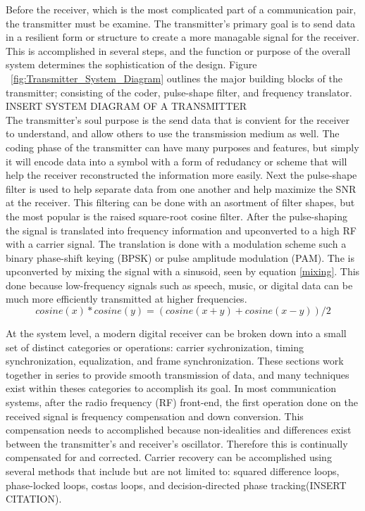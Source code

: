 \documentclass[11pt]{mvlthesis}
\begin{document}
Before the receiver, which is the most complicated part of a communication pair, the transmitter must be examine.  The transmitter's primary goal is to send data in a resilient form or structure to create a more managable signal for the receiver.  This is accomplished in several steps, and the function or purpose of the overall system determines the sophistication of the design.  Figure ~\ref{fig:Transmitter_System_Diagram} outlines the major building blocks of the transmitter; consisting of the coder, pulse-shape filter, and frequency translator.\\

INSERT SYSTEM DIAGRAM OF A TRANSMITTER\\

The transmitter's soul purpose is the send data that is convient for the receiver to understand, and allow others to use the transmission medium as well.  The coding phase of the transmitter can have many purposes and features, but simply it will encode data into a symbol with a form of redudancy or scheme that will help the receiver reconstructed the information more easily.  Next the pulse-shape filter is used to help separate data from one another and help maximize the SNR at the receiver.  This filtering can be done with an asortment of filter shapes, but the most popular is the raised square-root cosine filter.  After the pulse-shaping the signal is translated into frequency information and upconverted to a high RF with a carrier signal.  The translation is done with a modulation scheme such a binary phase-shift keying (BPSK) or pulse amplitude modulation (PAM).  The is upconverted by mixing the signal with a sinusoid, seen by equation \eqref{mixing}.  This done because low-frequency signals such as speech, music, or digital data can be much more efficiently transmitted at higher frequencies\cite{9}.  \\

\begin{equation}\label{mixing}

cosine(x)*cosine(y)=(cosine(x+y)+cosine(x-y))/2

\end{equation}


At the system level, a modern digital receiver can be broken down into a small set of distinct categories or operations: carrier sychronization, timing synchronization, equalization, and frame synchronization.  These sections work together in series to provide smooth transmission of data, and many techniques exist within theses categories to accomplish its goal.  In most communication systems, after the radio frequency (RF) front-end, the first operation done on the received signal is frequency compensation and down conversion.  This compensation needs to accomplished because non-idealities and differences exist between the transmitter's and receiver's oscillator.  Therefore this is continually compensated for and corrected.  Carrier recovery can be accomplished using several methods that include but are not limited to: squared difference loops, phase-locked loops, costas loops, and decision-directed phase tracking(INSERT CITATION).\\
\end{document}
